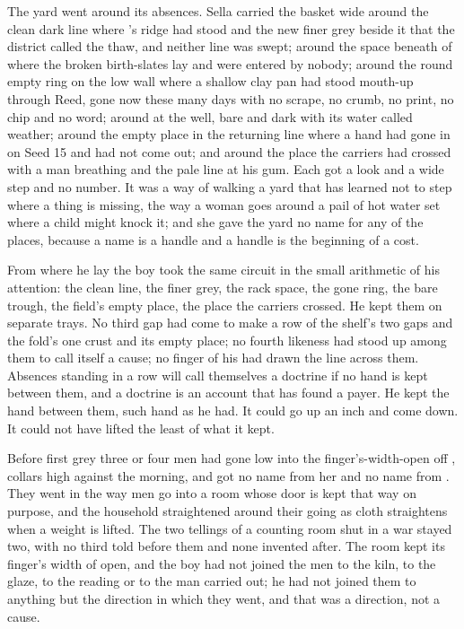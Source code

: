 The yard went around its absences. Sella carried the basket wide around the clean dark line where 's ridge had stood and the new finer grey beside it that the district called the thaw, and neither line was swept; around the space beneath  of  where the broken birth-slates lay and were entered by nobody; around the round empty ring on the low wall where a shallow clay pan had stood mouth-up through Reed, gone now these many days with no scrape, no crumb, no print, no chip and no word; around  at the well, bare and dark with its water called weather; around the empty place in the returning line where a hand had gone in on Seed 15 and had not come out; and around the place the carriers had crossed with a man breathing and the pale line at his gum. Each got a look and a wide step and no number. It was a way of walking a yard that has learned not to step where a thing is missing, the way a woman goes around a pail of hot water set where a child might knock it; and she gave the yard no name for any of the places, because a name is a handle and a handle is the beginning of a cost.

From where he lay the boy took the same circuit in the small arithmetic of his attention: the clean line, the finer grey, the rack space, the gone ring, the bare trough, the field's empty place, the place the carriers crossed. He kept them on separate trays. No third gap had come to make a row of the shelf's two gaps and the fold's one crust and its empty place; no fourth likeness had stood up among them to call itself a cause; no finger of his had drawn the line across them. Absences standing in a row will call themselves a doctrine if no hand is kept between them, and a doctrine is an account that has found a payer. He kept the hand between them, such hand as he had. It could go up an inch and come down. It could not have lifted the least of what it kept.

\scenebreak

Before first grey three or four men had gone low into the finger's-width-open  off , collars high against the morning, and got no name from her and no name from . They went in the way men go into a room whose door is kept that way on purpose, and the household straightened around their going as cloth straightens when a weight is lifted. The two tellings of a counting room shut in a war stayed two, with no third told before them and none invented after. The room kept its finger's width of open, and the boy had not joined the men to the kiln, to the glaze, to the reading or to the man carried out; he had not joined them to anything but the direction in which they went, and that was a direction, not a cause.

